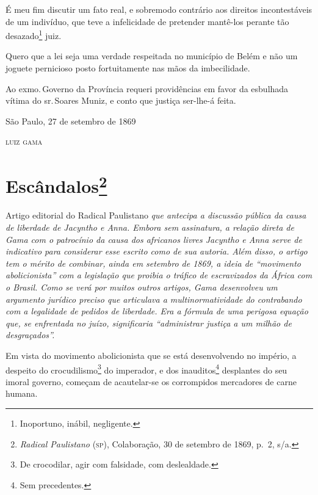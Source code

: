 É meu fim discutir um fato real, e sobremodo contrário aos direitos
incontestáveis de um indivíduo, que teve a infelicidade de pretender
mantê-los perante tão desazado\footnote{Inoportuno, inábil,
  negligente.} juiz.

Quero que a lei seja uma verdade respeitada no município de Belém e não
um joguete pernicioso posto fortuitamente nas mãos da imbecilidade.

Ao exmo.\,Governo da Província requeri providências em favor da esbulhada
vítima do sr.\,Soares Muniz, e conto que justiça ser-lhe-á feita.

\begin{flushright}
São Paulo, 27 de setembro de 1869

\textsc{luiz gama}
\end{flushright}

\chapter{Escândalos\footnote{\emph{Radical Paulistano} (\textsc{sp}),
  Colaboração, 30 de setembro de 1869, p.~2, s/a.}}

\begin{didascalia}
Artigo editorial do Radical Paulistano \emph{que antecipa a discussão
pública da causa de liberdade de Jacyntho e Anna. Embora sem assinatura,
a relação direta de Gama com o patrocínio da causa dos africanos livres
Jacyntho e Anna serve de indicativo para considerar esse escrito como de
sua autoria. Além disso, o artigo tem o mérito de combinar, ainda em
setembro de 1869, a ideia de ``movimento abolicionista'' com a legislação
que proibia o tráfico de escravizados da África com o Brasil. Como se
verá por muitos outros artigos, Gama desenvolveu um argumento jurídico
preciso que articulava a multinormatividade do contrabando com a
legalidade de pedidos de liberdade. Era a fórmula de uma perigosa
equação que, se enfrentada no juízo, significaria ``administrar justiça a
um milhão de desgraçados''.}
\end{didascalia}



Em vista do movimento abolicionista que se está desenvolvendo no
império, a despeito do crocudilismo\footnote{De crocodilar, agir com
  falsidade, com deslealdade.} do imperador, e dos inauditos\footnote{
  Sem precedentes.} desplantes do seu imoral governo, começam de
acautelar-se os corrompidos mercadores de carne humana.

